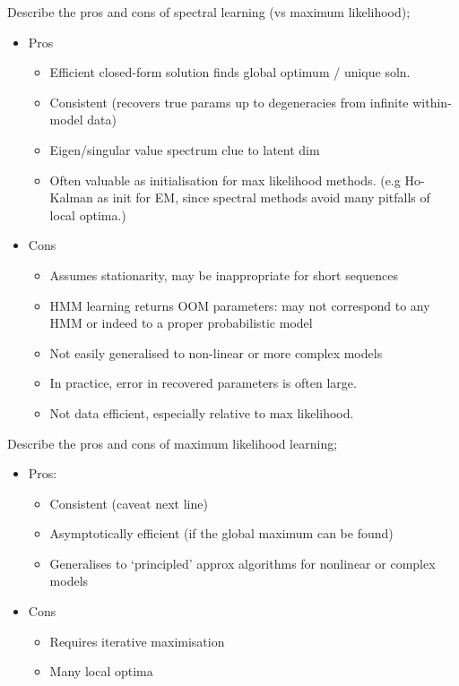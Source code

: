 \documentclass{article}
\begin{document}
Describe the pros and cons of spectral learning (vs maximum likelihood); \begin{itemize} \item Pros \begin{itemize} \item Efficient closed-form solution finds global optimum / unique soln. \item Consistent (recovers true params up to degeneracies from infinite within-model data) \item Eigen/singular value spectrum clue to latent dim \item Often valuable as initialisation for max likelihood methods. (e.g Ho-Kalman as init for EM, since spectral methods avoid many pitfalls of local optima.) \end{itemize} \item Cons \begin{itemize} \item Assumes stationarity, may be inappropriate for short sequences \item HMM learning returns OOM parameters: may not correspond to any HMM or indeed to a proper probabilistic model \item Not easily generalised to non-linear or more complex models \item In practice, error in recovered parameters is often large.  \item Not data efficient, especially relative to max likelihood. \end{itemize} \end{itemize}

Describe the pros and cons of maximum likelihood learning; \begin{itemize} \item Pros: \begin{itemize} \item Consistent (caveat next line) \item Asymptotically efficient (if the global maximum can be found) \item Generalises to `principled' approx algorithms for nonlinear or complex models  \end{itemize} \item Cons \begin{itemize} \item Requires iterative maximisation \item Many local optima \end{itemize} \end{itemize}
\end{document}
